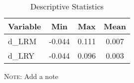 \begin{table}[htbp]
\centering
\begin{threeparttable} 
\begin{tabular}{lccc}
\toprule
Variable & Min & Max & Mean\\ \hline
d\_LRM & -0.044 & 0.111 & 0.007\\ 
d\_LRY & -0.044 & 0.096 & 0.003\\ 
\bottomrule
\end{tabular}
\begin{tablenotes} 
\footnotesize 
\item \textsc{Note:} Add a note 
\end{tablenotes} 
\end{threeparttable} 
\caption{Descriptive Statistics}
\label{}
\end{table}
